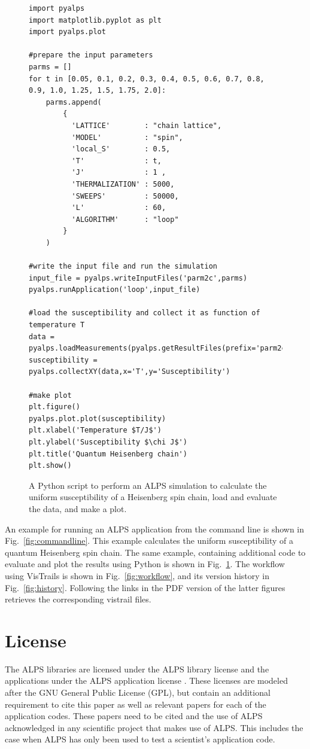 \documentclass[12pt]{iopart}
\begin{document}
\begin{figure}
\begin{tiny}
\begin{center}
\begin{verbatim}
import pyalps
import matplotlib.pyplot as plt
import pyalps.plot

#prepare the input parameters
parms = []
for t in [0.05, 0.1, 0.2, 0.3, 0.4, 0.5, 0.6, 0.7, 0.8, 0.9, 1.0, 1.25, 1.5, 1.75, 2.0]:
    parms.append(
        { 
          'LATTICE'        : "chain lattice", 
          'MODEL'          : "spin",
          'local_S'        : 0.5,
          'T'              : t,
          'J'              : 1 ,
          'THERMALIZATION' : 5000,
          'SWEEPS'         : 50000,
          'L'              : 60,
          'ALGORITHM'      : "loop"
        }
    )

#write the input file and run the simulation
input_file = pyalps.writeInputFiles('parm2c',parms)
pyalps.runApplication('loop',input_file)

#load the susceptibility and collect it as function of temperature T
data = pyalps.loadMeasurements(pyalps.getResultFiles(prefix='parm2c'),'Susceptibility')
susceptibility = pyalps.collectXY(data,x='T',y='Susceptibility')

#make plot
plt.figure()
pyalps.plot.plot(susceptibility)
plt.xlabel('Temperature $T/J$')
plt.ylabel('Susceptibility $\chi J$')
plt.title('Quantum Heisenberg chain')
plt.show()
\end{verbatim}
\end{center}
\end{tiny}
\caption{A Python script to perform an ALPS simulation to calculate the uniform susceptibility of a Heisenberg spin chain, load and evaluate the data, and make a plot. }
\label{fig:python}
\end{figure}

An example for running an ALPS application from the command line is shown in Fig.~\ref{fig:commandline}. This example calculates the uniform susceptibility of a quantum Heisenberg spin chain. The same example, containing additional code to evaluate and plot the results  using Python is shown in Fig.~\ref{fig:python}. The workflow using VisTrails is shown in Fig.~\ref{fig:workflow}, and its version history in Fig.~\ref{fig:history}. Following the links in the PDF version of the latter figures retrieves the corresponding vistrail files.

\section{License}
The ALPS libraries are licensed under the ALPS library license \cite{librarylicense} and the applications under the ALPS application license  \cite{applicationlicense}. These licenses are modeled after the GNU General Public License (GPL), but contain an additional requirement to cite this paper as well as relevant papers for each of the application codes. These papers need to be cited and the use of ALPS acknowledged in any scientific project that makes use of ALPS. This includes the case when ALPS has only been used to test a scientist's application code.
\end{document}
